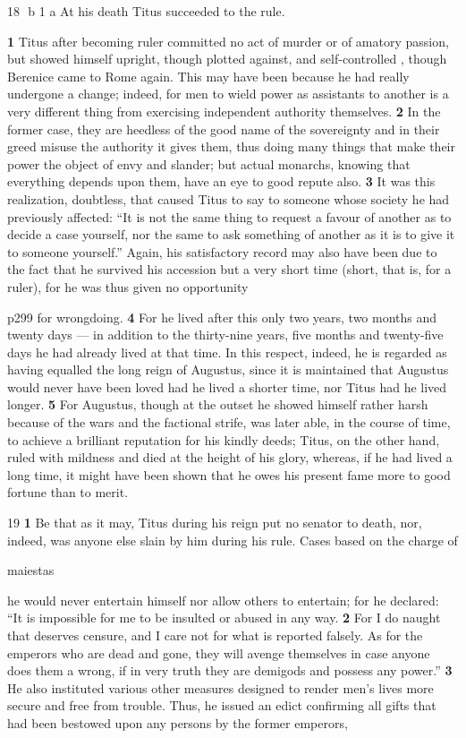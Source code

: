 18 \texthebrew{⁠} b
1 a At his death Titus succeeded to the rule.

\textbf{1} Titus after becoming ruler committed no act of murder or of amatory passion, but showed himself upright, though plotted against, and self-controlled , though Berenice came to Rome again. This may have been because he had really undergone a change; indeed, for men to wield power as assistants to another is a very different thing from exercising independent authority themselves. \textbf{2} In the former case, they are heedless of the good name of the sovereignty and in their greed misuse the authority it gives them, thus doing many things that make their power the object of envy and slander; but actual monarchs, knowing that everything depends upon them, have an eye to good repute also. \textbf{3} It was this realization, doubtless, that caused Titus to say to someone whose society he had previously affected: ``It is not the same thing to request a favour of another as to decide a case yourself, nor the same to ask something of another as it is to give it to someone yourself.'' Again, his satisfactory record may also have been due to the fact that he survived his accession but a very short time (short, that is, for a ruler), for he was thus given no opportunity

p299 for wrongdoing. \textbf{4} For he lived after this only two years, two months and twenty days \texthebrew{—} in addition to the thirty-nine years, five months and twenty-five days he had already lived at that time. In this respect, indeed, he is regarded as having equalled the long reign of Augustus, since it is maintained that Augustus would never have been loved had he lived a shorter time, nor Titus had he lived longer. \textbf{5} For Augustus, though at the outset he showed himself rather harsh because of the wars and the factional strife, was later able, in the course of time, to achieve a brilliant reputation for his kindly deeds; Titus, on the other hand, ruled with mildness and died at the height of his glory, whereas, if he had lived a long time, it might have been shown that he owes his present fame more to good fortune than to merit.

19
\textbf{1} Be that as it may, Titus during his reign put no senator to death, nor, indeed, was anyone else slain by him during his rule. Cases based on the charge of

maiestas

he would never entertain himself nor allow others to entertain; for he declared: ``It is impossible for me to be insulted or abused in any way. \textbf{2} For I do naught that deserves censure, and I care not for what is reported falsely. As for the emperors who are dead and gone, they will avenge themselves in case anyone does them a wrong, if in very truth they are demigods and possess any power.'' \textbf{3} He also instituted various other measures designed to render men's lives more secure and free from trouble. Thus, he issued an edict confirming all gifts that had been bestowed upon any persons by the former emperors,

